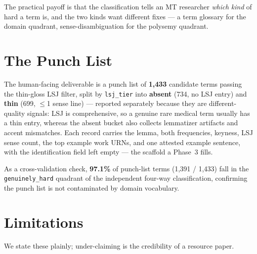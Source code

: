\documentclass[11pt]{article}
\begin{document}
The practical payoff is that the classification tells an MT researcher \textit{which kind} of hard a term
is, and the two kinds want different fixes --- a term glossary for the domain quadrant,
sense-disambiguation for the polysemy quadrant.

\section{The Punch List}
\label{sec:punch}

The human-facing deliverable is a punch list of \textbf{1{,}433} candidate terms passing the thin-gloss LSJ
filter, split by \texttt{lsj\_tier} into \textbf{absent} (734, no LSJ entry) and \textbf{thin} (699, $\le$1 sense line) ---
reported separately because they are different-quality signals: LSJ is comprehensive, so a genuine
rare medical term usually has a thin entry, whereas the absent bucket also collects lemmatizer
artifacts and accent mismatches. Each record carries the lemma, both frequencies, keyness, LSJ sense
count, the top example work URNs, and one attested example sentence, with the identification field
left empty --- the scaffold a Phase~3 fills.

As a cross-validation check, \textbf{97.1\%} of punch-list terms (1{,}391 / 1{,}433) fall in the
\texttt{genuinely\_hard} quadrant of the independent four-way classification, confirming the punch list is not
contaminated by domain vocabulary.

\section{Limitations}
\label{sec:limitations}

We state these plainly; under-claiming is the credibility of a resource paper.
\end{document}
